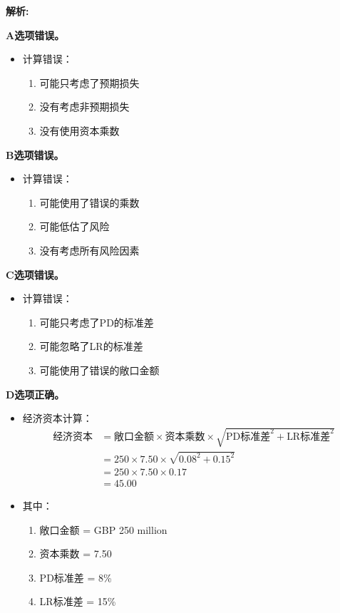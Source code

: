 \documentclass{article}
\newenvironment{explanation}
{\textbf{解析:}\par}
{\par}
\begin{document}
\begin{explanation}
    \textbf{A选项错误。}
    \begin{itemize}
        \item 计算错误：
        \begin{enumerate}
            \item 可能只考虑了预期损失
            \item 没有考虑非预期损失
            \item 没有使用资本乘数
        \end{enumerate}
    \end{itemize}
    
    \textbf{B选项错误。}
    \begin{itemize}
        \item 计算错误：
        \begin{enumerate}
            \item 可能使用了错误的乘数
            \item 可能低估了风险
            \item 没有考虑所有风险因素
        \end{enumerate}
    \end{itemize}
    
    \textbf{C选项错误。}
    \begin{itemize}
        \item 计算错误：
        \begin{enumerate}
            \item 可能只考虑了PD的标准差
            \item 可能忽略了LR的标准差
            \item 可能使用了错误的敞口金额
        \end{enumerate}
    \end{itemize}
    
    \textbf{D选项正确。}
    \begin{itemize}
        \item 经济资本计算：
        \[
        \begin{aligned}
        \text{经济资本} &= \text{敞口金额} \times \text{资本乘数} \times \sqrt{\text{PD标准差}^2 + \text{LR标准差}^2} \\
        &= 250 \times 7.50 \times \sqrt{0.08^2 + 0.15^2} \\
        &= 250 \times 7.50 \times 0.17 \\
        &= 45.00
        \end{aligned}
        \]
        \item 其中：
        \begin{enumerate}
            \item 敞口金额 = GBP 250 million
            \item 资本乘数 = 7.50
            \item PD标准差 = 8\%
            \item LR标准差 = 15\%
        \end{enumerate}
    \end{itemize}
\end{explanation}
\end{document}
